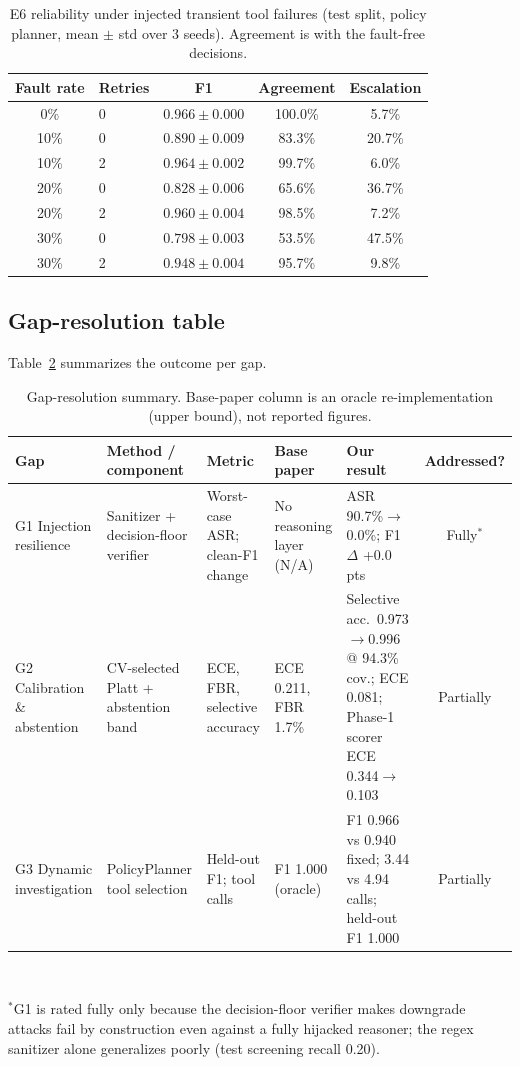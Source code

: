 \documentclass[conference]{IEEEtran}
\begin{document}
\begin{table}[t]
\caption{E6 reliability under injected transient tool failures (test split, policy
planner, mean $\pm$ std over 3 seeds). Agreement is with the fault-free decisions.}
\label{tab:rel}
\centering
\small
\begin{tabular}{@{}clccc@{}}
\toprule
Fault rate & Retries & F1 & Agreement & Escalation \\
\midrule
0\%  & 0 & $0.966\pm0.000$ & 100.0\% & 5.7\% \\
10\% & 0 & $0.890\pm0.009$ & 83.3\% & 20.7\% \\
10\% & 2 & $0.964\pm0.002$ & 99.7\% & 6.0\% \\
20\% & 0 & $0.828\pm0.006$ & 65.6\% & 36.7\% \\
20\% & 2 & $0.960\pm0.004$ & 98.5\% & 7.2\% \\
30\% & 0 & $0.798\pm0.003$ & 53.5\% & 47.5\% \\
30\% & 2 & $0.948\pm0.004$ & 95.7\% & 9.8\% \\
\bottomrule
\end{tabular}
\end{table}

\subsection{Gap-resolution table}
Table~\ref{tab:gap} summarizes the outcome per gap.

\begin{table}[t]
\caption{Gap-resolution summary. Base-paper column is an oracle re-implementation (upper bound), not reported figures.}
\label{tab:gap}
\centering
\small
\begin{tabular}{@{}p{2.2cm}p{3.6cm}p{3.0cm}p{2.3cm}p{3.2cm}c@{}}
\toprule
Gap & Method / component & Metric & Base paper & Our result & Addressed? \\
\midrule
G1 Injection resilience & Sanitizer + decision-floor verifier & Worst-case ASR; clean-F1 change & No reasoning layer (N/A) & ASR 90.7\%$\rightarrow$0.0\%; F1 $\Delta$ +0.0 pts & Fully$^\ast$ \\
G2 Calibration \& abstention & CV-selected Platt + abstention band & ECE, FBR, selective accuracy & ECE 0.211, FBR 1.7\% & Selective acc.\ 0.973$\rightarrow$0.996 @ 94.3\% cov.; ECE 0.081; Phase-1 scorer ECE 0.344$\rightarrow$0.103 & Partially \\
G3 Dynamic investigation & PolicyPlanner tool selection & Held-out F1; tool calls & F1 1.000 (oracle) & F1 0.966 vs 0.940 fixed; 3.44 vs 4.94 calls; held-out F1 1.000 & Partially \\
\bottomrule
\end{tabular}
\\[2pt]
\raggedright\footnotesize $^\ast$G1 is rated fully only because the decision-floor
verifier makes downgrade attacks fail by construction even against a fully hijacked
reasoner; the regex sanitizer alone generalizes poorly (test screening recall 0.20).
\end{table}
\end{document}
